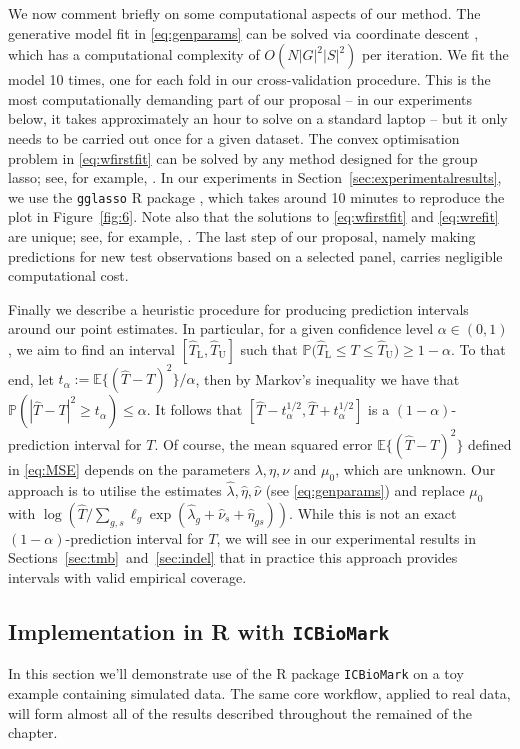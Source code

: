 \documentclass[../thesis.tex]{subfiles}
\begin{document}
We now comment briefly on some computational aspects of our method. The generative model fit in \eqref{eq:genparams} can be solved via coordinate descent \citep[see, for example,][]{friedman_regularization_2010}, which has a computational complexity of $O(N|G|^2|S|^2)$ per iteration.  We fit the model 10 times, one for each fold in our cross-validation procedure. This is the most computationally demanding part of our proposal -- in our experiments below, it takes approximately an hour to solve on a standard laptop -- but it only needs to be carried out once for a given dataset.  The convex optimisation problem in \eqref{eq:wfirstfit} can be solved by any method designed for the group \gls{lasso}; see, for example, \citet{yang_fast_2015}. In our experiments in Section~\ref{sec:experimentalresults}, we use the \texttt{gglasso} R package \citep{yang_gglasso_2020}, which takes around 10 minutes to reproduce the plot in Figure~\ref{fig:6}. Note also that the solutions to \eqref{eq:wfirstfit} and \eqref{eq:wrefit} are unique; see, for example, \citet[Theorem~1]{roth_group-lasso_2008}.  The last step of our proposal, namely making predictions for new test observations based on a selected panel, carries negligible computational cost.  

Finally we describe a heuristic procedure for producing prediction intervals around our point estimates.  In particular, for a given confidence level $\alpha \in (0,1)$, we aim to find an interval $[\hat{T}_{\mathrm{L}}, \hat{T}_{\mathrm{U}}]$ such that $\mathbb{P}\bigl(\hat{T}_{\mathrm{L}} \leq T \leq \hat{T}_{\mathrm{U}}\bigr) \geq 1- \alpha.$  To that end, let $t_\alpha := \mathbb{E}\{(\hat{T} - T)^2\}/\alpha$, then by Markov's inequality we have that $\mathbb{P}(|\hat{T} - T|^2 \geq t_\alpha) \leq \alpha$. It follows that $[\hat{T} - t_\alpha^{1/2} , \hat{T}+ t_\alpha^{1/2}]$ is a $(1-\alpha)$-prediction interval for $T$. Of course, the mean squared error $\mathbb{E}\{(\hat{T}-T)^2\}$ defined in \eqref{eq:MSE} depends on the parameters $\lambda, \eta, \nu$ and $\mu_0$, which are unknown.  Our approach is to utilise the estimates $\hat{\lambda}, \hat{\eta}, \hat{\nu}$ (see \eqref{eq:genparams}) and replace $\mu_0$ with $\log(\hat{T}/\sum_{g,s}\ell_g\exp(\hat{\lambda}_g + \hat{\nu}_s + \hat{\eta}_{gs}))$. While this is not an exact $(1-\alpha)$-prediction interval for $T$,  we will see in our experimental results in Sections~\ref{sec:tmb}~and~\ref{sec:indel} that in practice this approach provides intervals with valid empirical coverage.  

\subsection{Implementation in {R} with \texttt{ICBioMark} \label{sec:icbiomark}}
In this section we'll demonstrate use of the R package \texttt{ICBioMark} \citep{bradley_icbiomark_2021} on a toy example containing simulated data. The same core workflow, applied to real data, will form almost all of the results described throughout the remained of the chapter.
\end{document}
